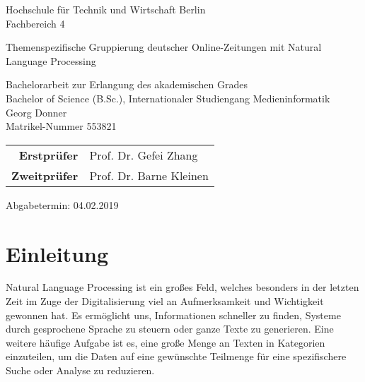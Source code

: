 
\pagestyle{empty} %

\clearscrheadings\clearscrplain
\begin{center}
\begin{large}
Hochschule für Technik und Wirtschaft Berlin\\
Fachbereich 4\\
\end{large}

\vspace{8mm}
\begin{Huge}
Themenspezifische Gruppierung deutscher Online-Zeitungen mit Natural Language Processing\\
\end{Huge}

\vspace{1.4cm}
Bachelorarbeit zur Erlangung des akademischen Grades\\
Bachelor of Science (B.Sc.), Internationaler Studiengang Medieninformatik\\
\vspace{0.4cm}
\vspace{2 cm}
Georg Donner\\
Matrikel-Nummer 553821\\
\vspace{7cm}
\begin{tabular}{rl}
{\bfseries Erstprüfer} & Prof. Dr. Gefei Zhang\\
{\bfseries Zweitprüfer} & Prof. Dr. Barne Kleinen\\
\end{tabular}

Abgabetermin: 04.02.2019

\end{center}
\clearpage

\pagestyle{useheadings} %

\tableofcontents %
\listoffigures %
\listoftables %
\clearpage

\chapter{Einleitung}
Natural Language Processing ist ein großes Feld, welches besonders in der letzten Zeit im Zuge der Digitalisierung viel an Aufmerksamkeit und Wichtigkeit gewonnen hat. Es ermöglicht uns, Informationen schneller zu finden, Systeme durch gesprochene Sprache zu steuern oder ganze Texte zu generieren. Eine weitere häufige Aufgabe ist es, eine große Menge an Texten in Kategorien einzuteilen, um die Daten auf eine gewünschte Teilmenge für eine spezifischere Suche oder Analyse zu reduzieren.

